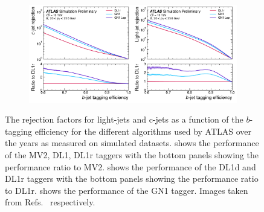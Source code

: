 \begin{figure}[h]
\begin{subfigure}{0.555\linewidth}
        \caption{}
        \label{fig:dl1d}
    \end{subfigure}
    \begin{subfigure}{0.85\linewidth}
        \centering
        \includegraphics[width=\linewidth]{Figures/cern_atlas/gn1roc.pdf}
        \caption{}
        \label{fig:gn1r}
    \end{subfigure}
    \caption{The rejection factors for light-jets and c-jets as a function of the $b$-tagging efficiency for the different algorithms used by ATLAS over the years as measured on simulated \ttbar datasets.  shows the performance of the MV2, DL1, DL1r taggers with the bottom panels showing the performance ratio to MV2.  shows the performance of the DL1d and DL1r taggers with the bottom panels showing the performance ratio to DL1r.  shows the performance of the GN1 tagger. Images taken from Refs.~\cite{Run2FTAlgs,AlexThesis,GN1} respectively.
    }
    \label{fig:btagging_roc}
\end{figure}

